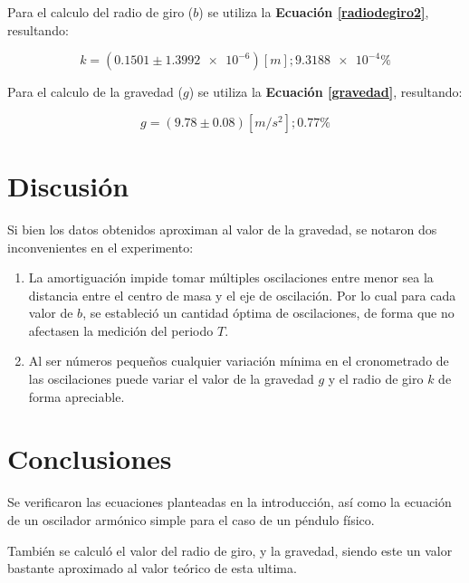 \documentclass[letter,11pt]{article}
\begin{document}
Para el calculo del radio de giro ($b$) se utiliza la
\textbf{Ecuación \ref{radiodegiro2}}, resultando:

\begin{equation*}
    k = (0.1501 \pm \num{1.3992e-6}) [m]; \num{9.3188e-4}\%
\end{equation*}
\vspace{0.10cm}

Para el calculo de la gravedad ($g$) se utiliza la
\textbf{Ecuación \ref{gravedad}}, resultando:

\begin{equation*}
    g = (9.78 \pm 0.08) [m/s^2]; 0.77\%
\end{equation*}
\vspace{0.10cm}

\section{Discusión}

Si bien los datos obtenidos aproximan al valor de la gravedad, se notaron dos
inconvenientes en el experimento:

\begin{enumerate}
\item La amortiguación impide tomar múltiples oscilaciones entre menor sea
la distancia entre el centro de masa y el eje de oscilación. Por lo cual para
cada valor de $b$, se estableció un cantidad óptima de oscilaciones, de forma
que no afectasen la medición del periodo $T$.
\item Al ser números pequeños cualquier variación mínima en el cronometrado
de las oscilaciones puede variar el valor de la gravedad $g$ y el radio de giro
$k$ de forma apreciable.
\end{enumerate}

\section{Conclusiones}

Se verificaron las ecuaciones planteadas en la introducción, así como la
ecuación de un oscilador armónico simple para el caso de un péndulo físico.

También se calculó el valor del radio de giro, y la gravedad, siendo este un
valor bastante aproximado al valor teórico de esta ultima.
\end{document}
